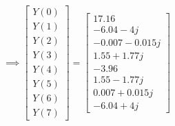 \documentclass[journal,12pt,twocolumn]{IEEEtran}
\renewcommand\thesection{\arabic{section}}
\begin{document}
\begin{enumerate}[label=\thesection.\arabic*.,ref=\thesection.\theenumi]
\begin{equation}
\implies
\begin{bmatrix}
Y(0) \\
Y(1) \\
Y(2) \\
Y(3) \\
Y(4) \\
Y(5) \\
Y(6) \\
Y(7)
\end{bmatrix}
=
\begin{bmatrix}
17.16 \\
-6.04 - 4j \\
-0.007-0.015j \\
1.55 +1.77j \\
-3.96 \\
1.55 -1.77j\\
0.007+0.015j  \\
-6.04 + 4j
\end{bmatrix}
\end{equation}



\end{enumerate}
\end{document}
